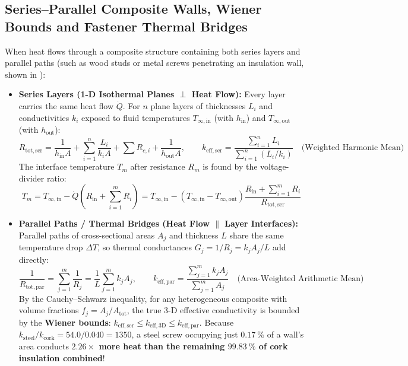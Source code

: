 \subsection{Series--Parallel Composite Walls, Wiener Bounds and Fastener Thermal Bridges}
When heat flows through a composite structure containing both series layers and parallel paths (such as wood studs or metal screws penetrating an insulation wall, shown in ):
\begin{itemize}
  \item \textbf{Series Layers (1-D Isothermal Planes $\perp$ Heat Flow):} Every layer carries the same heat flow $\dot{Q}$. For $n$ plane layers of thicknesses $L_i$ and conductivities $k_i$ exposed to fluid temperatures $T_{\infty,\mathrm{in}}$ (with $h_{\mathrm{in}}$) and $T_{\infty,\mathrm{out}}$ (with $h_{\mathrm{out}}$):
  \begin{equation}
    R_{\mathrm{tot,ser}} = \frac{1}{h_{\mathrm{in}}A} + \sum_{i=1}^n \frac{L_i}{k_i A} + \sum R_{c,i} + \frac{1}{h_{\mathrm{out}}A}, \qquad k_{\mathrm{eff,ser}} = \frac{\sum_{i=1}^n L_i}{\sum_{i=1}^n (L_i / k_i)} \quad \text{(Weighted Harmonic Mean)}
    \label{eq:10:series-keff}
  \end{equation}
  The interface temperature $T_m$ after resistance $R_m$ is found by the voltage-divider ratio:
  \begin{equation}
    T_m = T_{\infty,\mathrm{in}} - \dot{Q}\!\left(R_{\mathrm{in}} + \sum_{i=1}^m R_i\right) = T_{\infty,\mathrm{in}} - \left(T_{\infty,\mathrm{in}} - T_{\infty,\mathrm{out}}\right)\frac{R_{\mathrm{in}} + \sum_{i=1}^m R_i}{R_{\mathrm{tot,ser}}}
    \label{eq:10:node-temp}
  \end{equation}
  \item \textbf{Parallel Paths / Thermal Bridges (Heat Flow $\parallel$ Layer Interfaces):} Parallel paths of cross-sectional areas $A_j$ and thickness $L$ share the same temperature drop $\Delta T$, so thermal conductances $G_j = 1/R_j = k_j A_j / L$ add directly:
  \begin{equation}
    \frac{1}{R_{\mathrm{tot,par}}} = \sum_{j=1}^m \frac{1}{R_j} = \frac{1}{L}\sum_{j=1}^m k_j A_j, \qquad k_{\mathrm{eff,par}} = \frac{\sum_{j=1}^m k_j A_j}{\sum_{j=1}^m A_j} \quad \text{(Area-Weighted Arithmetic Mean)}
    \label{eq:10:parallel-keff}
  \end{equation}
  By the Cauchy--Schwarz inequality, for any heterogeneous composite with volume fractions $f_j = A_j/A_{\mathrm{tot}}$, the true 3-D effective conductivity is bounded by the \textbf{Wiener bounds}: $k_{\mathrm{eff,ser}} \le k_{\mathrm{eff,3D}} \le k_{\mathrm{eff,par}}$. Because $k_{\mathrm{steel}} / k_{\mathrm{cork}} = 54.0 / 0.040 = 1350$, a steel screw occupying just $\SI{0.17}{\percent}$ of a wall's area conducts \textbf{$2.26\times$ more heat than the remaining $\SI{99.83}{\percent}$ of cork insulation combined}!
\end{itemize}


